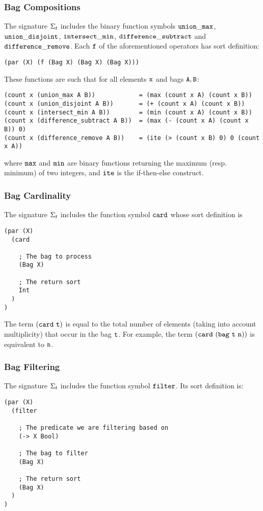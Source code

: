 \documentclass[english,a4paper,10pt]{article}
\begin{document}
\subsubsection{Bag Compositions}
\label{sec:bag-compositions}
The signature $\Sigma_{t}$ includes 
the binary function symbols 
${\tt union\_max}$, ${\tt union\_disjoint}$, 
${\tt intersect\_min}$, ${\tt difference\_subtract}$ and
${\tt difference\_remove}$.
Each ${\tt f}$ of the aforementioned operators
has sort definition:
\begin{verbatim}
(par (X) (f (Bag X) (Bag X) (Bag X)))
\end{verbatim}
These functions are such that for all elements ${\tt x}$
and bags ${\tt A,B}$:
\begin{verbatim}
(count x (union_max A B))            = (max (count x A) (count x B))
(count x (union_disjoint A B))       = (+ (count x A) (count x B))
(count x (intersect_min A B))        = (min (count x A) (count x B))
(count x (difference_subtract A B))  = (max (- (count x A) (count x B)) 0)
(count x (difference_remove A B))    = (ite (> (count x B) 0) 0 (count x A))
\end{verbatim}
where ${\tt max}$ and ${\tt min}$ are binary functions
returning the maximum (resp. minimum) of two integers, and ${\tt ite}$
is the if-then-else construct.

\subsubsection{Bag Cardinality}
The signature $\Sigma_{t}$ includes 
the function symbol ${\tt card}$ whose sort definition is
\begin{verbatim}
(par (X) 
  (card 
  
    ; The bag to process
    (Bag X) 
    
    ; The return sort
    Int
  )
)
\end{verbatim}
The term ${\tt (card\ t)}$ is equal to
the total number of elements (taking into account multiplicity)
that occur in the bag ${\tt t}$.
For example, the term $\syntax{(card\ (bag\ t\ n))}$ is
equivalent to ${\tt n}$.

\subsubsection{Bag Filtering}
The signature $\Sigma_{t}$ includes 
the function symbol ${\tt filter}$. Its sort definition is:

\begin{verbatim}
(par (X)
  (filter
  
    ; The predicate we are filtering based on
    (-> X Bool)
  
    ; The bag to filter
    (Bag X)
    
    ; The return sort
    (Bag X)
  )
)
\end{verbatim}
\end{document}
